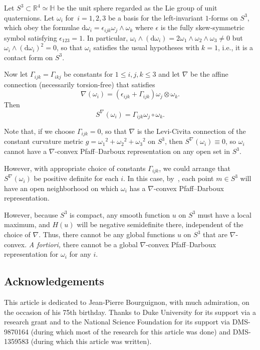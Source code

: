 \documentclass[pdftex]{sigma}
\renewcommand{\d}{\mathrm{d}}%
\newcommand{\w}{\wedge}
\numberwithin{equation}{section}
\begin{document}
\begin{Example}%
Let $S^3\subset\mathbb{R}^4\simeq\mathbb{H}$
be the unit sphere regarded as the Lie group of unit quaternions.
Let $\omega_i$ for~$i=1,2,3$ be a basis for the left-invariant $1$-forms
on $S^3$, which obey the formulae $\d\omega_i = \epsilon_{ijk} \omega_j\w\omega_k$ where $\epsilon$ is the fully skew-symmetric symbol
satisfying $\epsilon_{123}=1$. In particular, $\omega_i\w(\d\omega_i)
= 2 \omega_1\w\omega_2\w\omega_3\not=0$ but $\omega_i\w(\d\omega_i)^2 = 0$,
so that $\omega_i$ satisfies the usual hypotheses with $k=1$, i.e.,
it is a contact form on $S^3$.

Now let $\Gamma_{ijk}=\Gamma_{ikj}$ be constants for $1\le i,j,k\le 3$
and let $\nabla$ be the affine connection (necessarily torsion-free) that satisfies
\[
\nabla(\omega_i) = (\epsilon_{ijk}+\Gamma_{ijk}) \omega_j\otimes\omega_k .
\]
Then
\[
S^\nabla(\omega_i) = \Gamma_{ijk} \omega_j\circ\omega_k.
\]

Note that, if we choose $\Gamma_{ijk}=0$, so that $\nabla$
is the Levi-Civita connection of the constant curvature metric
$g = {\omega_1}^2+{\omega_2}^2+{\omega_3}^2$ on $S^3$,
then $S^\nabla(\omega_i)\equiv0$, so $\omega_i$ cannot
have a $\nabla$-convex Pfaff--Darboux representation
on any open set in $S^3$.

However, with appropriate choice of constants $\Gamma_{ijk}$,
we could arrange that
$S^\nabla(\omega_i)$ be positive definite for each $i$. In this case,
by~\cite[Theorem~1]{MR2023129}, each point $m\in S^3$ will have an open neighborhood
on which $\omega_i$ has a $\nabla$-convex Pfaff--Darboux representation.

However, because $S^3$ is compact, any smooth function $u$ on $S^3$
must have a local maximum, and $H(u)$ will be negative semidefinite
there, independent of the choice of $\nabla$. Thus, there cannot be
any global functions $u$ on $S^3$ that are $\nabla$-convex.
\emph{A fortiori,}
there cannot be a global $\nabla$-convex Pfaff--Darboux representation
for $\omega_i$ for any $i$.
\end{Example}

\subsection*{Acknowledgements}

This article is dedicated to Jean-Pierre Bourguignon,
with much admiration, on the occasion of his 75th birthday.
Thanks to Duke University for its support
via a research grant and to the National Science Foundation
for its support via DMS-9870164
(during which most of the research for this article was done)
and DMS-1359583 (during which this article was written).
\end{document}
